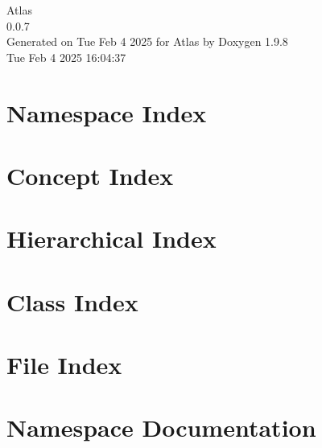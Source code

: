 \documentclass[twoside]{book}
\newcommand{\+}{\discretionary{\mbox{\scriptsize$\hookleftarrow$}}{}{}}
\newcommand{\clearemptydoublepage}{%
    \newpage{\pagestyle{empty}\cleardoublepage}%
  }
\begin{document}
  \raggedbottom
    \hypersetup{pageanchor=false,
                bookmarksnumbered=true,
                pdfencoding=unicode
               }
  \begin{titlepage}
  \vspace*{7cm}
  \begin{center}%
  {\Large Atlas}\\
  [1ex]\large 0.\+0.\+7 \\
  \vspace*{1cm}
  {\large Generated on Tue Feb 4 2025 for Atlas by Doxygen 1.9.8}\\
    \vspace*{0.5cm}
    {\small Tue Feb 4 2025 16:04:37}
  \end{center}
  \end{titlepage}
  \clearemptydoublepage
  \tableofcontents
  \clearemptydoublepage
  \hypersetup{pageanchor=true}





\chapter{Namespace Index}

\chapter{Concept Index}

\chapter{Hierarchical Index}

\chapter{Class Index}

\chapter{File Index}

\chapter{Namespace Documentation}














\end{document}

